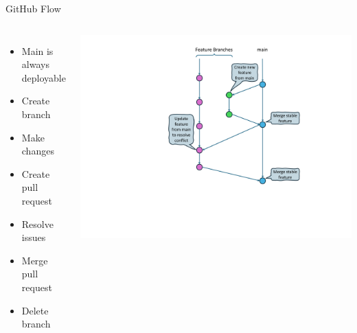\documentclass{slide}
\begin{document}
\begin{frame}{GitHub Flow \cite{github-flow}}
    \vspace{1pt}
    \begin{columns}
      {\LARGE
        \vspace{-2.5em}
        \begin{itemize}
            \item { Main is always deployable\\}
            \vspace{0.2em}
            \item Create branch
            \vspace{0.2em}
            \item Make changes
            \vspace{0.2em}
            \item Create pull request
            \vspace{0.2em}
            \item Resolve issues
            \vspace{0.2em}
            \item Merge pull request
            \vspace{0.2em}
            \item Delete branch
        \end{itemize}
      }
        \centering
        \includegraphics[trim=232 100 125 33,clip,height=\textheight]{diagrams/branching-diagrams/github-flow}
    \end{columns}
\end{frame}
\end{document}
